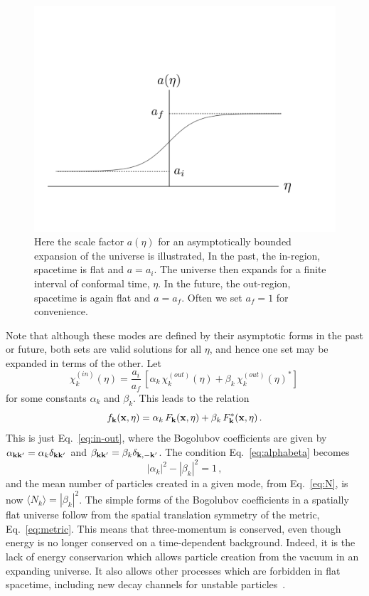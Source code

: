 \documentclass[eqsecnum,floats,aps,prd,floatfix,titlepage,tightenlines]{revtex4}
\begin{document}
\begin{figure}[htbp]
\includegraphics[scale=0.4]{bounded-expansion}
\caption{Here the scale factor $a(\eta)$ for an asymptotically bounded expansion of the universe is illustrated,
In the past, the in-region, spacetime is flat and $a=a_i$. The universe then expands for a finite interval of conformal
time, $\eta$. In the future, the out-region, spacetime is again flat and  $a=a_f$. Often we set $a_f = 1$ for convenience.}
\label{fig:boundedexpansion}
\end{figure}


Note that although these modes are defined by their asymptotic forms in the past or future, both sets are
valid solutions for all $\eta$, and hence one set may be expanded in terms of the other. Let
 \begin{equation}
  \chi_k^{(in)}(\eta) = \frac{a_i}{a_f}\, [\alpha_k\, \chi_k^{(out)}(\eta) + \beta_k\, \chi_k^{(out)}(\eta)^*]\,
  \label{eq:chi-alphabeta}
 \end{equation}
for some constants $\alpha_k$ and $\beta_k$. This leads to the relation
 \begin{equation}
 f_{\bf k}({\bf x},\eta)= \alpha_k\,  F_{\bf k}({\bf x},\eta) + \beta_k \, F^*_{\bf k}({\bf x},\eta) \,.
 \end{equation}
This is just Eq.~\eqref{eq:in-out}, where  the Bogolubov coefficients are given 
by $\alpha_{\bf k k'} = \alpha_k \delta_{\bf k k'}$ and $\beta_{\bf k k'} = \beta_k \delta_{\bf k, -k'}$.
The condition Eq.~\eqref{eq:alphabeta} becomes
 \begin{equation}
 |\alpha_k|^2 -  |\beta_k|^2 = 1\,,
 \label{eq:alphabeta2}
 \end{equation}
 and the mean number of particles created in a given mode, from Eq.~\eqref{eq:N}, is now $\langle N_k \rangle =  |\beta_k|^2$.
 The simple forms of the Bogolubov coefficients in a spatially flat universe follow from the spatial
 translation symmetry of the metric, Eq.~\eqref{eq:metric}. This means that three-momentum is conserved,
 even though energy is no longer conserved on a time-dependent background.  Indeed, it is the lack of energy conservarion 
 which allows particle creation from the vacuum in an expanding universe. It also allows other processes which are forbidden
 in flat spacetime, including new decay channels for unstable particles~\cite{Ford82,Lankinen18}. 
 
\end{document}
